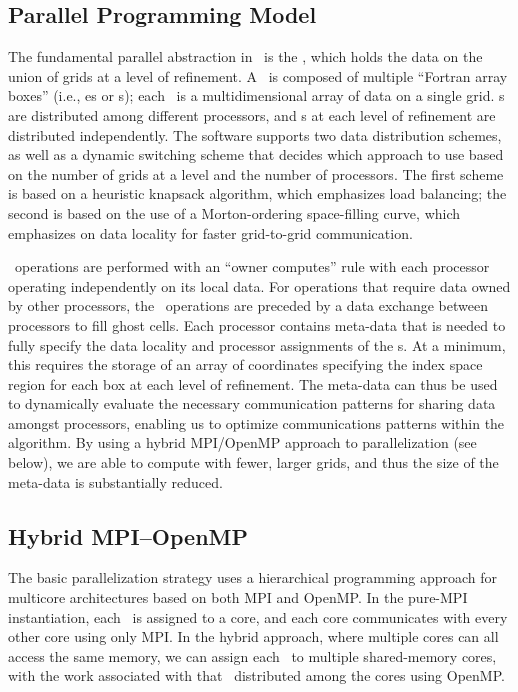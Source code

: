 \subsection{Parallel Programming Model}

The fundamental parallel abstraction in \FBoxLib\ is the \MultiFab, which holds the data on the 
union of grids at a level of refinement.  A \MultiFab\ is composed of multiple ``Fortran array boxes''
(i.e., \FArrayBox es or \Fab s); each \Fab\ is a multidimensional array of data on a single grid. 
\Fab s are distributed among different processors, and
\Fab s at each level of refinement are distributed 
independently.  The software supports two data distribution schemes, as well as a 
dynamic switching scheme that decides which approach to use based on the number of 
grids at a level and the number of processors.  The first scheme is based on a 
heuristic knapsack algorithm, which emphasizes load balancing; the second is based on 
the use of a Morton-ordering space-filling curve, which emphasizes on data locality for
faster grid-to-grid communication.

\MultiFab\ operations are performed with an ``owner computes'' rule 
with each processor operating independently on its local data.  For operations that 
require data owned by other processors, the \MultiFab\ operations are preceded by a 
data exchange between processors to fill ghost cells.  Each processor contains 
meta-data that is needed 
to fully specify the data locality and processor assignments of the \Fab s. At a 
minimum, this requires the storage of an array of coordinates specifying the index space 
region for each box at each level of refinement.  The meta-data can thus be used to 
dynamically evaluate the necessary communication patterns for sharing data amongst 
processors, enabling us to optimize communications patterns within the algorithm.
By using a hybrid MPI/OpenMP approach to parallelization (see below), we are able to 
compute with fewer, larger grids, and thus the size of the meta-data is substantially 
reduced.

\subsection{Hybrid MPI--OpenMP}

The basic parallelization strategy uses a hierarchical programming approach for 
multicore architectures based on both MPI and OpenMP.  In the pure-MPI instantiation, 
each \Fab\ is assigned to a core, and each core communicates 
with every other core using only MPI.  In the hybrid approach, where multiple cores
can all access the same memory, we can assign each \Fab\ to multiple shared-memory cores,
with the work associated with that \Fab\ distributed among the cores using OpenMP.

